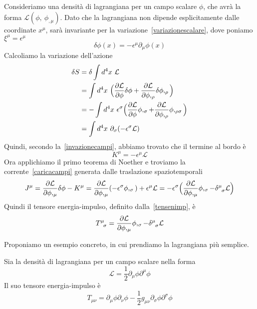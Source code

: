     Consideriamo una densità di lagrangiana per un campo scalare $\phi$, che avrà la forma $\mathcal L(\phi,~\phi_{, \mu})$. Dato che la lagrangiana non dipende esplicitamente dalle coordinate $x^\mu$, sarà invariante per la variazione~\eqref{variazionescalare}, dove poniamo $\xi^\mu = \epsilon^\mu$
    \begin{equation*}
        \delta \phi(x) = - \epsilon^\mu \partial_\mu \phi(x)
    \end{equation*}
    Calcoliamo la variazione dell'azione
    \begin{equation*}
    \begin{aligned}
        \delta S & = \delta \int d^4 x ~ \mathcal L \\ &  = \int d^4 x ~ \Big ( \frac{\partial\mathcal L}{\partial\phi} \delta \phi + \frac{\partial\mathcal L}{\partial\phi,_\rho} \delta \phi,_\rho \Big) \\ & = - \int d^4 x ~ \epsilon^\sigma \Big ( \frac{\partial\mathcal L}{\partial\phi} \phi,_\sigma + \frac{\partial\mathcal L}{\partial\phi,_\rho} \phi,_{\rho\sigma} \Big) \\ & = \int d^4 x ~ \partial_\sigma (- \epsilon^\sigma \mathcal L)
    \end{aligned}
    \end{equation*}
    Quindi, secondo la~\eqref{invazionecampi}, abbiamo trovato che il termine al bordo è
    \begin{equation*}
        K^\mu = - \epsilon^\mu \mathcal L
    \end{equation*}
    Ora applichiamo il primo teorema di Noether e troviamo la corrente~\eqref{caricacampi} generata dalle traslazione spaziotemporali
    \begin{equation*}
        J^\mu = \pdv{\mathcal L}{\phi,_\mu} \delta \phi - K^\mu = \pdv{\mathcal L}{\phi,_\mu} (- \epsilon^\sigma \phi,_\sigma) + \epsilon^\mu \mathcal L = - \epsilon^\sigma \Big ( \pdv{\mathcal L}{\phi,_\mu} \phi,_\sigma - \delta^\mu_{\phantom \mu \sigma} \mathcal L \Big)
    \end{equation*}
    Quindi il tensore energia-impulso, definito dalla~\eqref{tensenimp}, è
    \begin{equation*}
        T^\mu_{\phantom \mu \sigma} = \pdv{\mathcal L}{\phi,_\mu} \phi,_\sigma - \delta^\mu_{\phantom \mu \sigma} \mathcal L
    \end{equation*}

    \hfill

    Proponiamo un esempio concreto, in cui prendiamo la lagrangiana più semplice.

    \begin{example}
    Sia la densità di lagrangiana per un campo scalare nella forma
    \begin{equation*}
        \mathcal L = \frac{1}{2} \partial_\mu \phi \partial^\mu \phi
    \end{equation*}
    Il suo tensore energia-impulso è
    \begin{equation*}
        T_{\mu\nu} = \partial_\mu \phi \partial_\nu \phi - \frac{1}{2} g_{\mu\nu} \partial_\sigma \phi \partial^\sigma \phi
    \end{equation*}
    \end{example}

